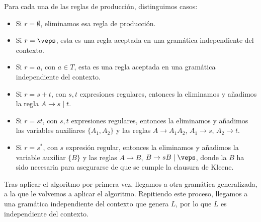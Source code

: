 \begin{ejercicio}
\begin{description}
        Para cada una de las reglas de producción, distinguimos casos:
        \begin{itemize}
            \item Si $r=\emptyset$, eliminamos esa regla de producción.
            \item Si $r=\veps$, esta es una regla aceptada en una gramática independiente del contexto.
            \item Si $r=a$, con $a\in T$, esta es una regla aceptada en una gramática independiente del contexto.
            \item Si $r=s+t$, con $s,t$ expresiones regulares, entonces la eliminamos y añadimos la regla $A\to s\mid t$.
            \item Si $r=st$, con $s,t$ expresiones regulares, entonces la eliminamos y añadimos las variables auxiliares $\{A_1,A_2\}$ y las reglas $A\to A_1A_2$, $A_1\to s$, $A_2\to t$.
            \item Si $r=s^*$, con $s$ expresión regular, entonces la eliminamos y añadimos la variable auxiliar $\{B\}$ y las reglas $A\to B$, $B\to sB\mid \veps$, donde la $B$ ha sido necesaria para asegurarse de que se cumple la clausura de Kleene.
        \end{itemize}

        Tras aplicar el algoritmo por primera vez, llegamos a otra gramática generalizada, a la que le volvemos a aplicar el algoritmo. Repitiendo este proceso, llegamos a una gramática independiente del contexto que genera $L$, por lo que $L$ es independiente del contexto.
    \end{description}
\end{ejercicio}

